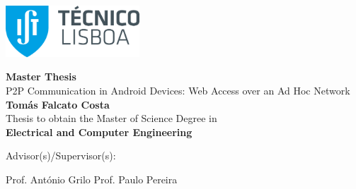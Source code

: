 
\begin{titlepage}
\includegraphics[width=5cm]{images/ist_logo}~\\[2.0cm]
\begin{center}
{\LARGE \textbf{Master Thesis}}\\[1.0cm]
{\Large P2P Communication in Android Devices: Web Access over an Ad Hoc Network}\\[1.0cm]
{\Large \textbf{Tomás Falcato Costa}}\\[1.0cm]
{\large Thesis to obtain the Master of Science Degree in}\\[1.0cm]
{\LARGE \textbf{Electrical and Computer Engineering}}\\[1.0cm]

\begin{minipage}[t]{.5\textwidth}
  \begin{flushright}
    {\large Advisor(s)/Supervisor(s):\:}
  \end{flushright}
\end{minipage}%
\begin{minipage}[t]{.5\textwidth}
  \begin{flushleft}
    {Prof. António Grilo
    \newline Prof. Paulo Pereira}
  \end{flushleft}
\end{minipage}\\[1.0cm]


\end{center}
\end{titlepage}
